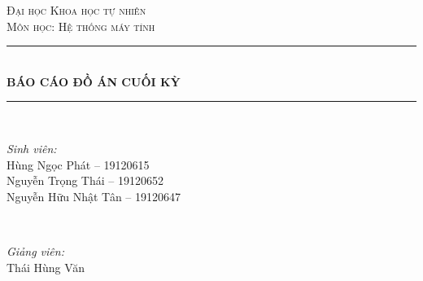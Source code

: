 \documentclass[12pt, final]{article}
\begin{document}
\begin{titlepage}

\vspace*{\fill}

\newcommand{\HRule}{\rule{\linewidth}{0.5mm}} %

\center %
 

\textsc{\LARGE Đại học Khoa học tự nhiên}\\[1.5cm] %
\textsc{\Large Môn học: Hệ thống máy tính}\\[0.5cm] %


\HRule \\[0.4cm]
{ \huge \bfseries BÁO CÁO ĐỒ ÁN CUỐI KỲ}\\[0.4cm] %
\HRule \\[1.5cm]
 

\begin{minipage}{0.4\textwidth}
\begin{flushleft} \large
\emph{Sinh viên:}\\
Hùng Ngọc Phát -- 19120615 \\ %
Nguyễn Trọng Thái -- 19120652 \\
Nguyễn Hữu Nhật Tân -- 19120647
\end{flushleft}
\end{minipage}
~
\begin{minipage}{0.4\textwidth}
\begin{flushright} \large
\emph{Giảng viên:} \\
Thái Hùng Văn %
\end{flushright}
\end{minipage}\\[2cm]


\end{titlepage}
\end{document}
